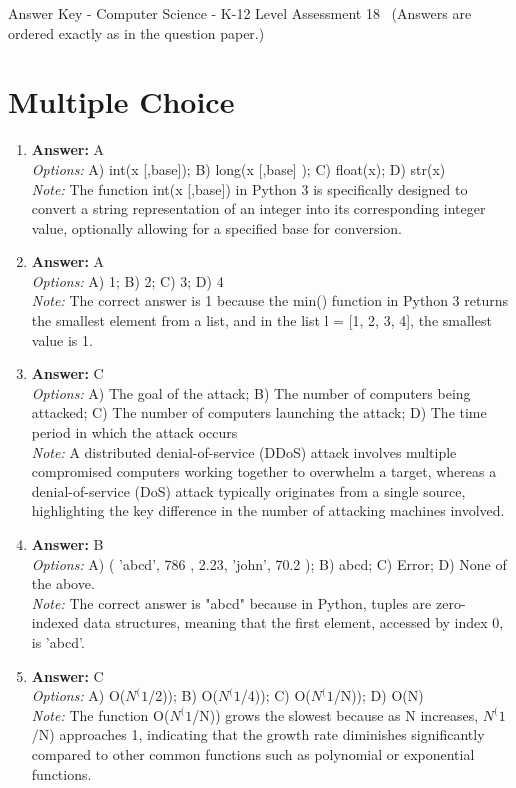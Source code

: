 \documentclass[12pt]{article}
\begin{document}
\begin{center}
Answer Key - Computer Science - K-12 Level Assessment 18 \
\small (Answers are ordered exactly as in the question paper.)
\end{center}

\section*{Multiple Choice}
\begin{enumerate}[label=\arabic*.]
\item \textbf{Answer:} A
\\ \textit{Options:} A) int(x [,base]); B) long(x [,base] ); C) float(x); D) str(x)
\\ \textit{Note:} The function int(x [,base]) in Python 3 is specifically designed to convert a string representation of an integer into its corresponding integer value, optionally allowing for a specified base for conversion.
\item \textbf{Answer:} A
\\ \textit{Options:} A) 1; B) 2; C) 3; D) 4
\\ \textit{Note:} The correct answer is 1 because the min() function in Python 3 returns the smallest element from a list, and in the list l = [1, 2, 3, 4], the smallest value is 1.
\item \textbf{Answer:} C
\\ \textit{Options:} A) The goal of the attack; B) The number of computers being attacked; C) The number of computers launching the attack; D) The time period in which the attack occurs
\\ \textit{Note:} A distributed denial-of-service (DDoS) attack involves multiple compromised computers working together to overwhelm a target, whereas a denial-of-service (DoS) attack typically originates from a single source, highlighting the key difference in the number of attacking machines involved.
\item \textbf{Answer:} B
\\ \textit{Options:} A) ( 'abcd', 786 , 2.23, 'john', 70.2 ); B) abcd; C) Error; D) None of the above.
\\ \textit{Note:} The correct answer is "abcd" because in Python, tuples are zero-indexed data structures, meaning that the first element, accessed by index 0, is 'abcd'.
\item \textbf{Answer:} C
\\ \textit{Options:} A) O($N^(1$/2)); B) O($N^(1$/4)); C) O($N^(1$/N)); D) O(N)
\\ \textit{Note:} The function O($N^(1$/N)) grows the slowest because as N increases, $N^(1$/N) approaches 1, indicating that the growth rate diminishes significantly compared to other common functions such as polynomial or exponential functions.
\end{enumerate}
\end{document}
